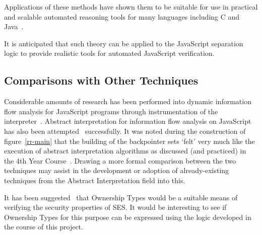 \documentclass[a4paper,notitlepage]{report}
\begin{document}
Applications of these methods have shown them to be suitable
for use in practical and scalable automated reasoning tools for many languages
including C and Java~\cite{smallf,slayerp,spacep,1449782}.

It is anticipated that such theory can be applied to the JavaScript separation
logic to provide realistic tools for automated JavaScript verification.

\subsection{Comparisons with Other Techniques}
Considerable amounts of research has been performed into dynamic information
flow analysis for JavaScript programs through instrumentation of the
interpreter~\cite{js-ifa}. Abstract interpretation for information flow analysis
on JavaScript has also been attempted~\cite{js-ifa2} successfully.
It was noted
during the construction of figure~\ref{rr-main} that the building of the
backpointer sets `felt' very much like the execution of abstract interpretation
algorithms as discussed (and practiced) in the 4th Year
Course~\cite{prog-anal,popa}. Drawing a more formal comparison between the two
techniques may assist in the development or adoption of already-existing
techniques from the Abstract Interpretation field into this.

It has been suggested~\cite{pubsdoc:rolesForOwners} that Ownership Types would
be a suitable means of verifying the security properties of SES. It would be
interesting to see if Ownership Types for this purpose can be expressed using
the logic developed in the course of this project.




\appendix
\end{document}
